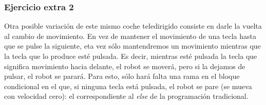 \subsubsection{Ejercicio extra 2}
Otra posible variación de este mismo coche teledirigido consiste en darle la vuelta al cambio de movimiento. En vez de mantener el movimiento de una tecla hasta que se pulse la siguiente, eta vez sólo mantendremos un movimiento mientras que la tecla que lo produce esté pulsada. Es decir, mientras esté pulsada la tecla que significa movimiento hacia delante, el robot se moverá, pero si la dejamos de pulsar, el robot se parará. Para esto, sólo hará falta una rama en el bloque condicional en el que, si ninguna tecla está pulsada, el robot se pare (se mueva con velocidad cero): el correspondiente al \textit{else} de la programación tradicional.

